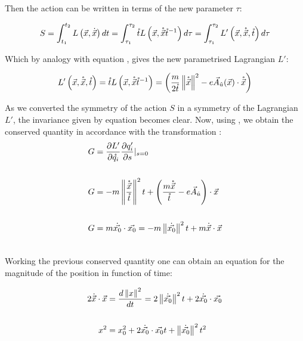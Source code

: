Then the action can be written in terms of the new parameter $\tau$:

\begin{equation*}
S = \int_{t_1}^{t_2}L\left( \vec{x},\dot{\vec{x}} \right)dt = \int_{\tau_1}^{\tau_2}\mathring{t}L\left( \vec{x},\mathring{\vec{x}}{\mathring{t}}^{-1} \right)d\tau                                                                    = \int_{\tau_1}^{\tau_2}L'\left( \vec{x},\mathring{\vec{x}},\mathring{t} \right)d\tau
\label{eq:action}
\end{equation*}

Which by analogy with equation , gives the new parametrised Lagrangian $L'$:

\begin{equation*}
L'\left( \vec{x},\mathring{\vec{x}},\mathring{t} \right) = \mathring{t}L\left( \vec{x},\mathring{\vec{x}}{\mathring{t}}^{-1} \right) = \left( \frac{m}{2\mathring{t}}\left\lVert \mathring{\vec{x}} \right\rVert^2 - e\vec{A}_{\hat{u}}(\vec{x})\cdot\mathring{\vec{x}} \right)
\end{equation*}

As we converted the symmetry of the action $S$ in a symmetry of the Lagrangian $L'$, the invariance given by  equation becomes clear. Now, using \cite[Thm (dontforget)]{scheck}, we obtain the conserved quantity in accordance with the transformation : \\

\begin{align*}
\nonumber
G &= \frac{\partial L'}{\partial \mathring{q_i}} \frac{\partial q'_i}{\partial s} \rvert_{s=0}\\ \nonumber
\\ \nonumber
G &= -m\left\lVert \frac{\mathring{\vec{x}}}{\mathring{t}} \right\rVert^2t + \left( \frac{m\mathring{\vec{x}}}{\mathring{t}} - e\vec{A}_{\hat{u}} \right)\cdot \vec{x}\\ \nonumber
\\ \nonumber
G &= m\dot{\vec{x_0}}\cdot\vec{x_0} = -m\left\lVert \dot{\vec{x_0}} \right\rVert^2t + m\dot{\vec{x}}\cdot\vec{x} \\\nonumber
\end{align*}

Working the previous conserved quantity one can obtain an equation for the magnitude of the position in function of time:

\begin{align}
\nonumber
 2\dot{\vec{x}}\cdot\vec{x} &= \frac{d\left\lVert x \right\rVert^2}{dt} = 2\left\lVert \dot{\vec{x_0}} \right\rVert^2t + 2\dot{\vec{x_0}}\cdot\vec{x_0}\\ \nonumber
 \\ 
 x^2 &= x_0^2 +2\dot{\vec{x_0}}\cdot\vec{x_0}t +\left\lVert \dot{\vec{x_0}} \right\rVert^2t^2  
 \label{eq:radius}
\end{align}

